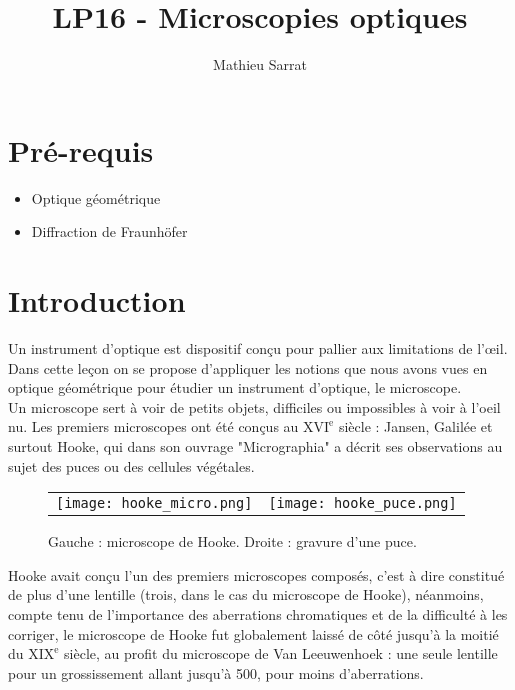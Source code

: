 \documentclass[11pt,a4paper]{report}
\author{Mathieu Sarrat}
\title{LP16 - Microscopies optiques}
\begin{document}
\maketitle

\section*{Pré-requis}
\begin{itemize}
	\item Optique géométrique
	\item Diffraction de Fraunhöfer
\end{itemize}

\newpage
\section*{Introduction}

Un instrument d'optique est dispositif conçu pour pallier aux limitations de l'œil. Dans cette leçon on se propose d'appliquer les notions que nous avons vues en optique géométrique pour étudier un instrument d'optique, le microscope.\\

Un microscope sert à voir de petits objets, difficiles ou impossibles à voir à l'oeil nu. Les premiers microscopes ont été conçus au $\text{XVI}^\text{e}$ siècle : Jansen, Galilée et surtout Hooke, qui dans son ouvrage "Micrographia" a décrit ses observations au sujet des puces ou des cellules végétales.\\

\begin{figure}[h!]
	\begin{center}
		\begin{tabular}{cc}
  		\texttt{[image: hooke\_micro.png]} &
   		\texttt{[image: hooke\_puce.png]}\\
	\end{tabular}
	\end{center}
	\caption{Gauche : microscope de Hooke. Droite : gravure d'une puce.}
\end{figure}

Hooke avait conçu l'un des premiers microscopes composés, c'est à dire constitué de plus d'une lentille (trois, dans le cas du microscope de Hooke), néanmoins, compte tenu de l'importance des aberrations chromatiques et de la difficulté à les corriger, le microscope de Hooke fut globalement laissé de côté jusqu'à la moitié du $\text{XIX}^\text{e}$ siècle, au profit du microscope de Van Leeuwenhoek : une seule lentille pour un grossissement allant jusqu'à 500, pour moins d'aberrations.\\
\end{document}
